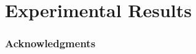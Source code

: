 \documentclass{article}
\begin{document}
\section{Experimental Results}
\label{sec:experimental_results}


\subsubsection*{Acknowledgments}



\small

\clearpage
\newpage


\end{document}
